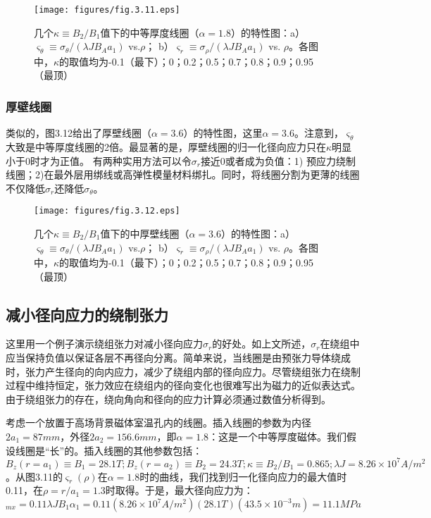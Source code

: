 \begin{figure}
  \centering
 \texttt{[image: figures/fig.3.11.eps]}
  \caption{几个$\kappa\equiv B_2/B_1$值下的中等厚度线圈（$\alpha=1.8$）的特性图：a）$\varsigma_\theta\equiv \sigma_\theta/(\lambda J B_A a_1)$ vs.$\rho$；
  b）$\varsigma_r \equiv \sigma_\rho/(\lambda J B_A a_1)$ vs. $\rho$。各图中，$\kappa$的取值均为-0.1（最下）；0；0.2；0.5；0.7；0.8；0.9；0.95（最顶） }
\end{figure}

\subsubsection{厚壁线圈}
类似的，图3.12给出了厚壁线圈（$\alpha=3.6$）的特性图，这里$\alpha=3.6$。注意到，$\varsigma_\theta$大致是中等厚度线圈的2倍。最显著的是，厚壁线圈的归一化径向应力只在$\kappa$明显小于0时才为正值。
有两种实用方法可以令$\sigma_{r}$接近0或者成为负值：1) 预应力绕制线圈；2)在最外层用绑线或高弹性模量材料绑扎。同时，将线圈分割为更薄的线圈不仅降低$\sigma_{r}$还降低$\sigma_{\theta}$。
\begin{figure}
  \centering
 \texttt{[image: figures/fig.3.12.eps]}
  \caption{几个$\kappa\equiv B_2/B_1$值下的中厚壁线圈（$\alpha=3.6$）的特性图：a）$\varsigma_\theta\equiv \sigma_\theta/(\lambda J B_A a_1)$ vs.$\rho$；
  b）$\varsigma_r \equiv \sigma_\rho/(\lambda J B_A a_1)$ vs. $\rho$。各图中，$\kappa$的取值均为-0.1（最下）；0；0.2；0.5；0.7；0.8；0.9；0.95（最顶） }
\end{figure}


\subsection{减小径向应力的绕制张力}
这里用一个例子演示绕组张力对减小径向应力$\sigma_{r}$的好处。如上文所述，$\sigma_{r}$在绕组中应当保持负值以保证各层不再径向分离。简单来说，当线圈是由预张力导体绕成时，张力产生径向的向内应力，减少了绕组内部的径向应力。尽管绕组张力在绕制过程中维持恒定，张力效应在绕组内的径向变化也很难写出为磁力的近似表达式。由于绕组张力的存在，绕向角向和径向的应力计算必须通过数值分析得到。

考虑一个放置于高场背景磁体室温孔内的线圈。插入线圈的参数为内径$2a_1=87 mm$，外径$2a_2=156.6 mm$，即$\alpha = 1.8$：这是一个中等厚度磁体。我们假设线圈是“长”的。插入线圈的其他参数包括：
$B_z(r=a_1)\equiv B_1 =28.1 T; B_z(r=a_2)\equiv B_2 =24.3 T;\kappa\equiv B_2/B_1 = 0.865; \lambda J =8.26×10^7 A/m^2$。从图3.11的$\varsigma_r(\rho)$在$\alpha=1.8$时的曲线，我们找到归一化径向应力的最大值时0.11，在$\rho=r/a_1=1.3$时取得。于是，最大径向应力为：
\begin{equation}
  [\sigma_r]_{mx}=0.11\lambda JB_1\alpha_1  =0.11(8.26\times 10^7 A/m^2)(28.1T)(43.5\times10^{-3}m)=11.1MPa%
\end{equation}

